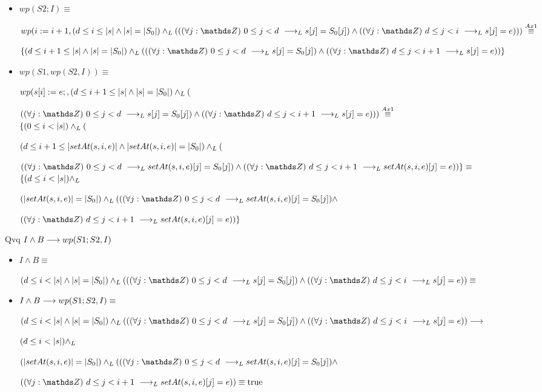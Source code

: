 \documentclass{article}
\begin{document}
\begin{itemize}
    \item $wp(S2; I) \equiv$

    $wp(i:= i+1, (d \leq i \leq \longitud{s} \wedge \longitud{s} = \longitud{S_{0}}) \yLuego ((\paraTodo{j}{0}{d}\implicaLuego s[j] = S_{0}[j]) \wedge (\paraTodo{j}{d}{i}\implicaLuego s[j] = e ))) \stackrel{Ax1}{\equiv}$

    $\{(d \leq i+1 \leq \longitud{s} \wedge \longitud{s} = \longitud{S_{0}}) \yLuego ((\paraTodo{j}{0}{d}\implicaLuego s[j] = S_{0}[j]) \wedge (\paraTodo{j}{d}{i+1}\implicaLuego s[j] = e )) \}$

    \item $wp(S1, wp(S2, I)) \equiv$

    $wp(s[i] := e;, (d \leq i+1 \leq |s| \wedge |s| = |S_{0}|) \land _L ($
    
    $(\paraTodo{j}{0}{d}\implicaLuego s[j] = S_{0}[j]) \wedge (\paraTodo{j}{d}{i+1}\implicaLuego s[j] = e )))\stackrel{Ax1}{\equiv}$ \\

    $\{ (0 \leq i < |s|) \land _L ($

    $ (d \leq i+1 \leq |setAt(s,i,e)| \wedge |setAt(s,i,e)| = |S_{0}|) \land _L ($
    
    $(\paraTodo{j}{0}{d}\implicaLuego setAt(s,i,e)[j] = S_{0}[j]) \wedge (\paraTodo{j}{d}{i+1}\implicaLuego setAt(s,i,e)[j] = e ))\} \equiv$ \\

    $\{ (d \leq i < |s|) \land _L $
    
    $(\longitud{setAt(s,i,e)} = \longitud{S_{0}}) \yLuego ((\paraTodo{j}{0}{d}\implicaLuego setAt(s,i,e)[j] = S_{0}[j]) \wedge $
    
    $(\paraTodo{j}{d}{i+1}\implicaLuego setAt(s,i,e)[j] = e )) \}$

\end{itemize}

Qvq $I \wedge B \longrightarrow wp(S1;S2, I)$

\begin{itemize}
    \item $I \wedge B \equiv$
    
    $ (d \leq i < \longitud{s} \wedge \longitud{s} = \longitud{S_{0}}) \yLuego ((\paraTodo{j}{0}{d}\implicaLuego s[j] = S_{0}[j]) \wedge (\paraTodo{j}{d}{i}\implicaLuego s[j] = e )) \equiv$

    \item $I \wedge B \longrightarrow wp(S1;S2, I) \equiv$

    $ (d \leq i < \longitud{s} \wedge \longitud{s} = \longitud{S_{0}}) \yLuego ((\paraTodo{j}{0}{d}\implicaLuego s[j] = S_{0}[j]) \wedge (\paraTodo{j}{d}{i}\implicaLuego s[j] = e )) \implica$

    $ (d \leq i < |s|) \land _L $
    
    $(\longitud{setAt(s,i,e)} = \longitud{S_{0}}) \yLuego ((\paraTodo{j}{0}{d}\implicaLuego setAt(s,i,e)[j] = S_{0}[j]) \wedge $
    
    $(\paraTodo{j}{d}{i+1}\implicaLuego setAt(s,i,e)[j] = e )) \equiv \True$
\end{itemize}
\end{document}
